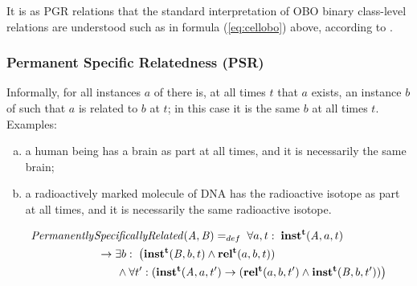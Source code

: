 It is as PGR relations that the standard interpretation of OBO binary class-level relations are understood such as in formula (\ref{eq:cellobo}) above, according to \cite{OBO:RO}.

\subsubsection*{Permanent Specific Relatedness (PSR)}

Informally, for all instances $a$ of  there is, at all times $t$ that $a$ exists, an
instance $b$ of  such that $a$ is related to $b$ at $t$; in this case it is the
same $b$ at all times $t$. Examples:
\begin{enumerate}[(a)]
\item a human being has a brain as part at all times, and it is necessarily the same brain;
\item a radioactively marked molecule of DNA has the radioactive isotope as part
at all times, and it is necessarily the same radioactive isotope.
\end{enumerate}

\begin{equation}
\begin{split}
\mathit{Permanently}&\mathit{SpecificallyRelated}(\mathit{A},\mathit{B}) =_{def}\;
\forall a, t:\; \mathrm{\mathbf{inst^t}}(\mathit{A}, a, t) \\
&\ \rightarrow
\exists b:\;\big(\mathrm{\mathbf{inst^t}}(\mathit{B},b,t) \wedge
\mathrm{\mathbf{rel^t}}(a,b,t))
\\
&\quad\quad \wedge \forall t^\prime: (\mathrm{\mathbf{inst^t}}(\mathit{A},a,t^\prime)
\rightarrow (\mathrm{\mathbf{rel^t}}(a,b,t^\prime) \wedge
\mathrm{\mathbf{inst^t}}(\mathit{B},b,t^\prime))\big)
\end{split}
\label{eq:specifically:cls}
\end{equation}

